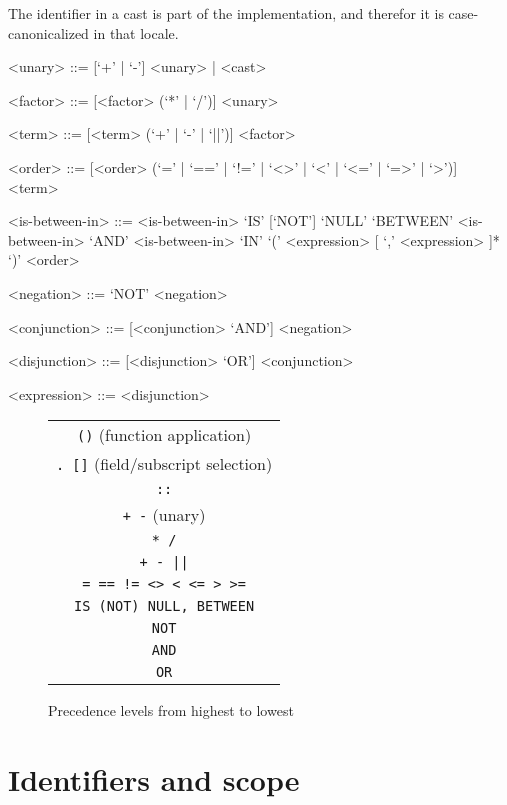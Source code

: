 \documentclass{article}
\begin{document}
The identifier in a cast is part of the \SoQL{} implementation, and
therefor it is case-canonicalized in that locale.

\begin{grammar}
<unary> ::= [`+' | `-'] <unary> | <cast>

<factor> ::= [<factor> (`*' | `/')] <unary>

<term> ::= [<term> (`+' | `-' | `||')] <factor>

<order> ::= [<order> (`=' | `==' | `!=' | `<>' | `<' | `<=' | `=>' | `>')] <term>

<is-between-in> ::= <is-between-in> `IS' [`NOT'] `NULL'
  `BETWEEN' <is-between-in> `AND' <is-between-in>
  `IN' `(' <expression>  [ `,' <expression> ]* `)'
 \alt <order>

<negation> ::= `NOT' <negation>

<conjunction> ::= [<conjunction> `AND'] <negation>

<disjunction> ::= [<disjunction> `OR'] <conjunction>

<expression> ::= <disjunction>
\end{grammar}

\begin{figure}
\begin{center}
\begin{tabular}{c}
\lstinline|()| (function application) \\
\lstinline|. []| (field/subscript selection) \\
\lstinline|::| \\
\lstinline|+ -| (unary) \\
\lstinline|* /| \\
\lstinline!+ - ||! \\
\lstinline|= == != <> < <= > >=| \\
\lstinline|IS (NOT) NULL, BETWEEN| \\
\lstinline|NOT| \\
\lstinline|AND| \\
\lstinline|OR| \\
\end{tabular}
\end{center}
\caption{Precedence levels from highest to lowest}
\label{precedence}
\end{figure}

\section{Identifiers and scope}
\end{document}
